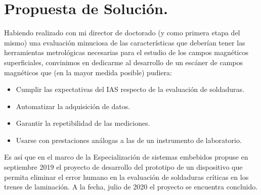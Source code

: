 \section{Propuesta de Solución.}

Habiendo realizado con mi director de doctorado (y como primera etapa del mismo) una evaluación minuciosa de las características que deberían tener las herramientas metrológicas necesarias para el estudio de los campos magnéticos superficiales, convinimos en dedicarme al desarrollo de un escáner de campos magnéticos que (en la mayor medida posible) pudiera:

\begin{itemize}
	\item Cumplir las expectativas del IAS respecto de la evaluación de soldaduras.
	\item Automatizar la adquisición de datos.
	\item Garantir la repetibilidad de las mediciones.
	\item Usarse con prestaciones análogas a las de un instrumento de laboratorio.
\end{itemize}

Es así que en el marco de la Especialización de sistemas embebidos propuse en septiembre 2019 el proyecto de desarrollo del prototipo de un dispositivo que permita eliminar el error humano en la evaluación de soldaduras críticas en los trenes de laminación. A la fecha, julio de 2020 el proyecto se encuentra concluido.


